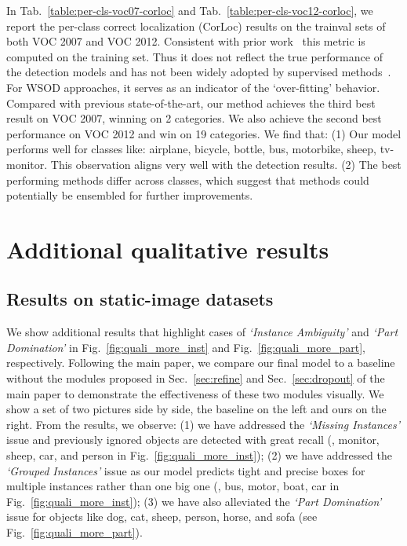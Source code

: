 \documentclass[10pt,twocolumn,letterpaper]{article}
\begin{document}
In Tab.~\ref{table:per-cls-voc07-corloc} and Tab.~\ref{table:per-cls-voc12-corloc}, we report the per-class correct localization (CorLoc) results on the trainval sets of both VOC 2007 and VOC 2012. Consistent with prior work~\cite{Bilen16, tang2017multiple, c-mil, Zeng_2019_ICCV, Zhang_2018_CVPR, Arun_2019} this metric is computed on the training set. Thus it does not reflect the true performance of the detection models and has not been widely adopted by supervised methods~\cite{fastrcnn, ren16faster, he2017maskrcnn}. For WSOD approaches, it serves as an indicator of the `over-fitting' behavior. Compared with previous state-of-the-art, our method achieves the third best result on VOC 2007, winning on 2 categories. We also achieve the second best performance on VOC 2012 and win on 19 categories. We find that: (1) Our model performs well for  classes like: airplane, bicycle, bottle, bus, motorbike, sheep, tv-monitor. This observation aligns very well with the detection results. (2) The best performing methods differ across  classes, which suggest that  methods could potentially be ensembled for further improvements. 


\section{Additional qualitative results}
\label{app:fig}
\subsection{Results on static-image datasets}
We show additional results that highlight cases of \textit{`Instance Ambiguity'} and \textit{`Part Domination'} in Fig.~\ref{fig:quali_more_inst} and Fig.~\ref{fig:quali_more_part}, respectively. Following the main paper, we compare our final model to a baseline without the modules proposed in Sec.~\ref{sec:refine} and Sec.~\ref{sec:dropout} of the main paper to demonstrate the effectiveness of these two modules visually.  We show a set of two pictures side by side, the baseline on the left and ours on the right. From the results, we observe: (1) we have addressed the \textit{`Missing Instances'} issue and previously ignored objects are detected with great recall (\eg, monitor, sheep, car, and person in Fig.~\ref{fig:quali_more_inst}); (2) we have addressed the \textit{`Grouped Instances'} issue as our model predicts tight and precise boxes for multiple instances rather than one big one (\eg, bus, motor, boat, car in Fig.~\ref{fig:quali_more_inst}); (3) we have also alleviated the \textit{`Part Domination'} issue for  objects like dog, cat, sheep, person, horse, and sofa (see Fig.~\ref{fig:quali_more_part}).
\end{document}
